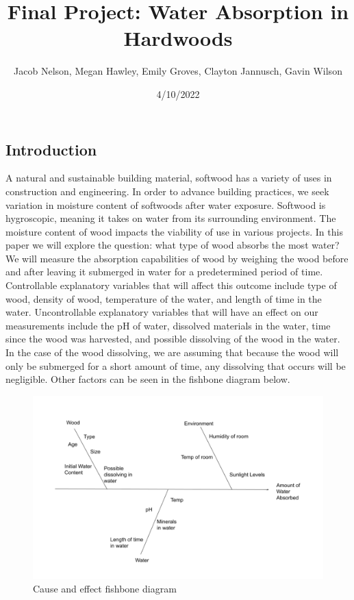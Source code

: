 \documentclass[
]{article}
\title{Final Project: Water Absorption in Hardwoods}
\author{Jacob Nelson, Megan Hawley, Emily Groves, Clayton Jannusch,
Gavin Wilson}
\date{4/10/2022}
\begin{document}
\maketitle

\hypertarget{introduction}{%
\subsection{Introduction}\label{introduction}}

A natural and sustainable building material, softwood has a variety of
uses in construction and engineering. In order to advance building
practices, we seek variation in moisture content of softwoods after
water exposure. Softwood is hygroscopic, meaning it takes on water from
its surrounding environment. The moisture content of wood impacts the
viability of use in various projects. In this paper we will explore the
question: what type of wood absorbs the most water? We will measure the
absorption capabilities of wood by weighing the wood before and after
leaving it submerged in water for a predetermined period of time.
Controllable explanatory variables that will affect this outcome include
type of wood, density of wood, temperature of the water, and length of
time in the water. Uncontrollable explanatory variables that will have
an effect on our measurements include the pH of water, dissolved
materials in the water, time since the wood was harvested, and possible
dissolving of the wood in the water. In the case of the wood dissolving,
we are assuming that because the wood will only be submerged for a short
amount of time, any dissolving that occurs will be negligible. Other
factors can be seen in the fishbone diagram below.

\begin{figure}

{\centering \includegraphics[width=0.8\linewidth]{fishbone} 

}

\caption{Cause and effect fishbone diagram}\label{fig:unnamed-chunk-1}
\end{figure}
\end{document}
